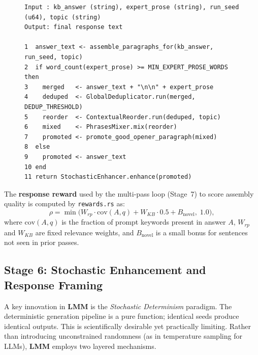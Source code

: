 \documentclass[11pt,a4paper]{article}
\newcommand{\lmm}{\texorpdfstring{%
  \textbf{\color{lmmAccent}LMM}}{LMM}}
\begin{document}
\begin{figure}[H]
\begin{lstlisting}[style=pseudo, caption={Paragraph assembly pseudocode}, label={alg:assembly}]
Input : kb_answer (string), expert_prose (string), run_seed (u64), topic (string)
Output: final response text

1  answer_text <- assemble_paragraphs_for(kb_answer, run_seed, topic)
2  if word_count(expert_prose) >= MIN_EXPERT_PROSE_WORDS then
3    merged   <- answer_text + "\n\n" + expert_prose
4    deduped  <- GlobalDeduplicator.run(merged, DEDUP_THRESHOLD)
5    reorder  <- ContextualReorder.run(deduped, topic)
6    mixed    <- PhrasesMixer.mix(reorder)
7    promoted <- promote_good_opener_paragraph(mixed)
8  else
9    promoted <- answer_text
10 end
11 return StochasticEnhancer.enhance(promoted)
\end{lstlisting}
\end{figure}

The \textbf{response reward} used by the multi-pass loop (Stage~7) to score assembly quality
is computed by \texttt{rewards.rs} as:
\begin{equation}
  \rho = \min\!\bigl(W_{rp} \cdot \mathrm{cov}(A, q) + W_{KB} \cdot 0.5 + B_{\mathrm{novel}},\; 1.0\bigr),
  \label{eq:reward_quality}
\end{equation}
where $\mathrm{cov}(A, q)$ is the fraction of prompt keywords present in answer $A$,
$W_{rp}$ and $W_{KB}$ are fixed relevance weights, and $B_{\mathrm{novel}}$ is a small
bonus for sentences not seen in prior passes.

\subsection{Stage 6: Stochastic Enhancement and Response Framing}
\label{sec:stochastic}

A key innovation in \lmm{} is the \emph{Stochastic Determinism} paradigm. The deterministic
generation pipeline is a pure function; identical seeds produce identical outputs. This is
scientifically desirable yet practically limiting. Rather than introducing unconstrained
randomness (as in temperature sampling for LLMs), \lmm{} employs two layered mechanisms.
\end{document}
